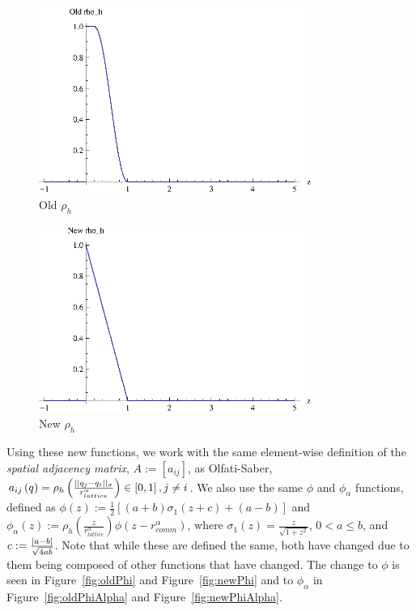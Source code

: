 \documentclass[10pt, conference, compsocconf]{IEEEtran}
\begin{document}
\begin{figure}[!b]
  \begin{center}
    \includegraphics[width=3.5in]{rhoHOld}
  \end{center}

  \caption{\small Old $\rho_h$}
  \label{fig:rhoHOld}
\end{figure}

\begin{figure}[!b]
  \begin{center}
    \includegraphics[width=3.5in]{rhoHNew}
  \end{center}

  \caption{\small New $\rho_h$}
  \label{fig:rhoHNew}
\end{figure}

Using these new functions, we work with the same element-wise definition of the \textit{spatial adjacency matrix}, $A := [a_{ij}]$, as Olfati-Saber, $a_{ij}\left(q\right) = \rho_{h}\left(\frac{\lvert\lvert q_j - q_i\rvert\rvert_{\sigma}}{r_{lattice}^{\alpha}}\right) \in \left[0, 1\right], j \neq i$.
%
We also use the same $\phi$ and $\phi_{\alpha}$ functions, defined as $\phi(z) := \frac{1}{2}\left[(a+b)\sigma_1(z+c)+(a-b)\right]$ and $\phi_{\alpha}(z) := \rho_h(\frac{z}{r_{lattice}^{\alpha}})\phi(z - r_{comm}^{\alpha})$, where $\sigma_1(z) = \frac{z}{\sqrt{1 + z^2}}$, $0 < a \leq b$, and $c := \frac{\lvert a - b\rvert}{\sqrt{4ab}}$.
%
Note that while these are defined the same, both have changed due to them being composed of other functions that have changed.
%
The change to $\phi$ is seen in Figure~\ref{fig:oldPhi} and Figure~\ref{fig:newPhi} and to $\phi_{\alpha}$ in Figure~\ref{fig:oldPhiAlpha} and Figure~\ref{fig:newPhiAlpha}.
\end{document}

